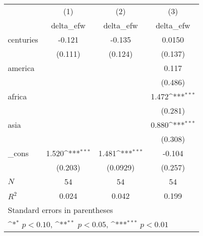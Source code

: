 {
\def\sym#1{\ifmmode^{#1}\else\(^{#1}\)\fi}
\begin{tabular}{l*{3}{c}}
\hline\hline
            &\multicolumn{1}{c}{(1)}&\multicolumn{1}{c}{(2)}&\multicolumn{1}{c}{(3)}\\
            &\multicolumn{1}{c}{delta\_efw}&\multicolumn{1}{c}{delta\_efw}&\multicolumn{1}{c}{delta\_efw}\\
\hline
centuries   &      -0.121         &      -0.135         &      0.0150         \\
            &     (0.111)         &     (0.124)         &     (0.137)         \\
[1em]
america     &                     &                     &       0.117         \\
            &                     &                     &     (0.486)         \\
[1em]
africa      &                     &                     &       1.472\sym{***}\\
            &                     &                     &     (0.281)         \\
[1em]
asia        &                     &                     &       0.880\sym{***}\\
            &                     &                     &     (0.308)         \\
[1em]
\_cons      &       1.520\sym{***}&       1.481\sym{***}&      -0.104         \\
            &     (0.203)         &    (0.0929)         &     (0.257)         \\
\hline
\(N\)       &          54         &          54         &          54         \\
\(R^{2}\)   &       0.024         &       0.042         &       0.199         \\
\hline\hline
\multicolumn{4}{l}{\footnotesize Standard errors in parentheses}\\
\multicolumn{4}{l}{\footnotesize \sym{*} \(p<0.10\), \sym{**} \(p<0.05\), \sym{***} \(p<0.01\)}\\
\end{tabular}
}
